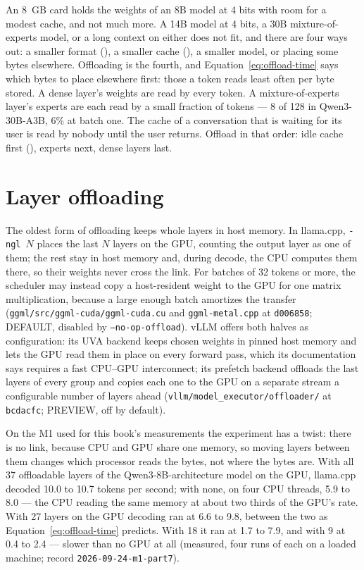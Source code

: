 An 8~GB card holds the weights of an 8B model at 4 bits with room for a
modest cache, and not much more. A 14B model at 4 bits, a 30B mixture-of-experts
model, or a long context on either does not fit, and there are four ways out:
a smaller format (), a smaller cache
(), a smaller model, or placing some bytes elsewhere.
Offloading is the fourth, and Equation~\ref{eq:offload-time} says which bytes
to place elsewhere first: those a token reads least often per byte stored. A
dense layer's weights are read by every token. A mixture-of-experts layer's
experts are each read by a small fraction of tokens --- 8 of 128 in Qwen3-30B-A3B,
6\% at batch one. The cache of a conversation that is waiting for its user is
read by nobody until the user returns. Offload in that order: idle cache first
(), experts next, dense layers last.

\section{Layer offloading}

The oldest form of offloading keeps whole layers in host memory. In llama.cpp,
\texttt{-ngl}~$N$ places the last $N$ layers on the GPU, counting the output
layer as one of them; the rest stay in host memory and, during decode, the CPU
computes them there, so their weights never cross the link. For batches of 32
tokens or more, the scheduler may instead copy a host-resident weight to the GPU
for one matrix multiplication, because a large enough batch amortizes the
transfer (\texttt{ggml/src/ggml-cuda/ggml-cuda.cu} and
\texttt{ggml-metal.cpp} at \texttt{d006858}; DEFAULT, disabled by
\texttt{--no-op-offload}). vLLM offers both halves as configuration: its UVA
backend keeps chosen weights in pinned host memory and lets the GPU read them in
place on every forward pass, which its documentation says requires a fast
CPU--GPU interconnect; its prefetch backend offloads the last layers of every
group and copies each one to the GPU on a separate stream a configurable number
of layers ahead (\texttt{vllm/model\_executor/offloader/} at \texttt{bcdacfc};
PREVIEW, off by default).

On the M1 used for this book's measurements the experiment has a twist:
there is no link, because CPU and GPU share one memory, so moving layers
between them changes which processor reads the bytes, not where the bytes are.
With all 37 offloadable layers of the Qwen3-8B-architecture model on the GPU,
llama.cpp decoded 10.0 to 10.7 tokens per second; with none, on four CPU
threads, 5.9 to 8.0 --- the CPU reading the same memory at about two thirds of
the GPU's rate. With 27 layers on the GPU decoding ran at 6.6 to 9.8, between
the two as Equation~\ref{eq:offload-time} predicts. With 18 it ran at 1.7 to 7.9,
and with 9 at 0.4 to 2.4 --- slower than no GPU at all (measured, four runs of
each on a loaded machine; record \texttt{2026-09-24-m1-part7}).

